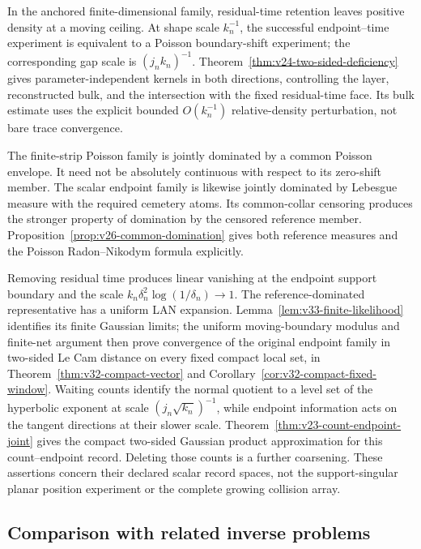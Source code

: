 In the anchored finite-dimensional family, residual-time retention leaves
positive density at a moving ceiling.  At shape scale \(k_n^{-1}\), the
successful endpoint--time experiment is equivalent to a Poisson boundary-shift
experiment; the corresponding gap scale is \((j_nk_n)^{-1}\).
Theorem~\ref{thm:v24-two-sided-deficiency} gives parameter-independent kernels
in both directions, controlling the layer, reconstructed bulk, and the
intersection with the fixed residual-time face.  Its bulk estimate uses the
explicit bounded \(O(k_n^{-1})\) relative-density perturbation, not bare
trace convergence.

The finite-strip Poisson family is jointly dominated by a common Poisson
envelope.  It need not be absolutely continuous with respect to its
zero-shift member.  The scalar endpoint family is likewise jointly dominated
by Lebesgue measure with the required cemetery atoms.  Its common-collar
censoring produces the stronger property of domination by the censored
reference member.  Proposition~\ref{prop:v26-common-domination} gives both
reference measures and the Poisson Radon--Nikodym formula explicitly.

Removing residual time produces linear vanishing at the endpoint support
boundary and the scale \(k_n\delta_n^2\log(1/\delta_n)\to1\).
The reference-dominated representative has a uniform LAN expansion.
Lemma~\ref{lem:v33-finite-likelihood} identifies its finite Gaussian limits;
the uniform moving-boundary modulus and finite-net argument then prove
convergence of the original endpoint family in two-sided Le Cam distance
on every fixed compact local set, in Theorem~\ref{thm:v32-compact-vector}
and Corollary~\ref{cor:v32-compact-fixed-window}.
Waiting counts identify the normal quotient to a level set of the
hyperbolic exponent at scale \((j_n\sqrt{k_n})^{-1}\), while endpoint
information acts on the tangent directions at their slower scale.
Theorem~\ref{thm:v23-count-endpoint-joint} gives the compact two-sided
Gaussian product approximation for this count--endpoint record.
Deleting those counts is a further coarsening.  These assertions concern
their declared scalar record spaces, not the support-singular planar
position experiment or the complete growing collision array.

\subsection{Comparison with related inverse problems}

